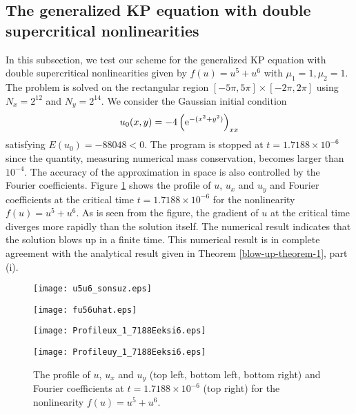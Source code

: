 \documentclass[10pt]{article}
\numberwithin{equation}{section}
\newcommand{\ee}{{\rm e}}
\begin{document}
	
	
	\subsection{The generalized KP equation with double supercritical nonlinearities }
	
	In this subsection,   we test our scheme for the generalized KP equation with double supercritical nonlinearities given by \mbox{$f(u)=u^5+u^6$} with $\mu_1=1, \mu_2=1$. The problem is solved on the rectangular region $[-5\pi, 5\pi]\times [-2\pi, 2\pi]$
	using ${N_x}=2^{12}$ and ${N_y}=2^{14}$.  We consider the Gaussian initial condition
	\begin{equation}
		u_0(x,y)=-4\left(\ee^ {-({x^2}+{y^2})}\right)_{xx} \label{initialu5u6}
	\end{equation}
	satisfying $E(u_0)=-88048<0$.  The program is stopped at $t=1.7188\times 10^{-6}$ since the quantity, measuring numerical mass conservation, becomes larger than $10^{-4}$.   The accuracy of the approximation in space is also controlled by the Fourier coefficients.
	Figure \ref{u5u6} shows the profile of  $ u $,   $ u_x $ and $ u_y $   and  Fourier coefficients  at the critical time \mbox{$t=1.7188\times 10^{-6}$} for the nonlinearity $f(u)=u^5+u^6$. As is seen from the figure, the gradient of $u$  at the critical time diverges more rapidly than the solution itself.
	The numerical result indicates that the solution blows up in a finite time. This numerical result is in complete agreement with the analytical result given in Theorem \ref{blow-up-theorem-1}, part (i).
	\begin{figure}[!htbp]
		\begin{minipage}[t]{0.45\linewidth}
			\centering
			\texttt{[image: u5u6\_sonsuz.eps]}
		\end{minipage}%
		\hspace{20pt}
		\begin{minipage}[t]{0.45\linewidth}
			\centering
			\texttt{[image: fu56uhat.eps]}
		\end{minipage}
		\begin{minipage}[t]{0.45\linewidth}
			\centering
			\texttt{[image: Profileux\_1\_7188Eeksi6.eps]}
		\end{minipage}%
		\hspace{40pt}
		\begin{minipage}[t]{0.45\linewidth}
			\centering
			\texttt{[image: Profileuy\_1\_7188Eeksi6.eps]}
		\end{minipage}
		\caption{ The profile of  $ u $,   $ u_x $ and $ u_y $  (top left, bottom left, bottom right)  and  Fourier coefficients at $t=1.7188\times 10^{-6}$ (top right) for the nonlinearity $f(u)=u^5+u^6$.}\label{u5u6}
	\end{figure}
	
\end{document}

